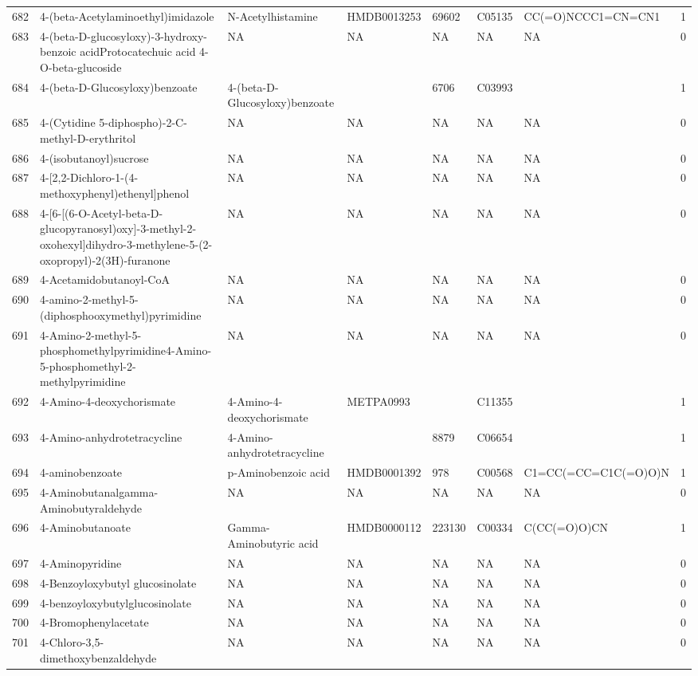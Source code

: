 \documentclass[a4paper]{article}
\begin{document}
\begin{longtable}{rlllllll}
  682 & 4-(beta-Acetylaminoethyl)imidazole & N-Acetylhistamine & HMDB0013253 & 69602 & C05135 & CC(=O)NCCC1=CN=CN1 & 1 \\ 
  683 & 4-(beta-D-glucosyloxy)-3-hydroxy-benzoic acidProtocatechuic acid 4-O-beta-glucoside & NA & NA & NA & NA & NA & 0 \\ 
  684 & 4-(beta-D-Glucosyloxy)benzoate & 4-(beta-D-Glucosyloxy)benzoate &  & 6706 & C03993 &  & 1 \\ 
  685 & 4-(Cytidine 5-diphospho)-2-C-methyl-D-erythritol & NA & NA & NA & NA & NA & 0 \\ 
  686 & 4-(isobutanoyl)sucrose & NA & NA & NA & NA & NA & 0 \\ 
  687 & 4-[2,2-Dichloro-1-(4-methoxyphenyl)ethenyl]phenol & NA & NA & NA & NA & NA & 0 \\ 
  688 & 4-[6-[(6-O-Acetyl-beta-D-glucopyranosyl)oxy]-3-methyl-2-oxohexyl]dihydro-3-methylene-5-(2-oxopropyl)-2(3H)-furanone & NA & NA & NA & NA & NA & 0 \\ 
  689 & 4-Acetamidobutanoyl-CoA & NA & NA & NA & NA & NA & 0 \\ 
  690 & 4-amino-2-methyl-5-(diphosphooxymethyl)pyrimidine & NA & NA & NA & NA & NA & 0 \\ 
  691 & 4-Amino-2-methyl-5-phosphomethylpyrimidine4-Amino-5-phosphomethyl-2-methylpyrimidine & NA & NA & NA & NA & NA & 0 \\ 
  692 & 4-Amino-4-deoxychorismate & 4-Amino-4-deoxychorismate & METPA0993 &  & C11355 &  & 1 \\ 
  693 & 4-Amino-anhydrotetracycline & 4-Amino-anhydrotetracycline &  & 8879 & C06654 &  & 1 \\ 
  694 & 4-aminobenzoate & p-Aminobenzoic acid & HMDB0001392 & 978 & C00568 & C1=CC(=CC=C1C(=O)O)N & 1 \\ 
  695 & 4-Aminobutanalgamma-Aminobutyraldehyde & NA & NA & NA & NA & NA & 0 \\ 
  696 & 4-Aminobutanoate & Gamma-Aminobutyric acid & HMDB0000112 & 223130 & C00334 & C(CC(=O)O)CN & 1 \\ 
  697 & 4-Aminopyridine & NA & NA & NA & NA & NA & 0 \\ 
  698 & 4-Benzoyloxybutyl glucosinolate & NA & NA & NA & NA & NA & 0 \\ 
  699 & 4-benzoyloxybutylglucosinolate & NA & NA & NA & NA & NA & 0 \\ 
  700 & 4-Bromophenylacetate & NA & NA & NA & NA & NA & 0 \\ 
  701 & 4-Chloro-3,5-dimethoxybenzaldehyde & NA & NA & NA & NA & NA & 0 \\ 

\end{longtable}
\end{document}
